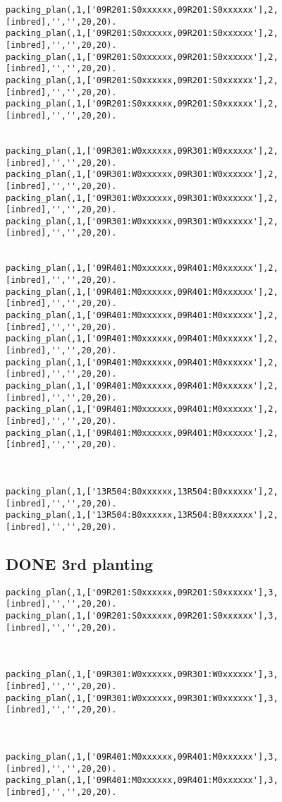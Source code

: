 \documentclass[11pt]{article}
\begin{document}
\begin{verbatim}
packing_plan(,1,['09R201:S0xxxxxx,09R201:S0xxxxxx'],2,[inbred],'','',20,20).
packing_plan(,1,['09R201:S0xxxxxx,09R201:S0xxxxxx'],2,[inbred],'','',20,20).
packing_plan(,1,['09R201:S0xxxxxx,09R201:S0xxxxxx'],2,[inbred],'','',20,20).
packing_plan(,1,['09R201:S0xxxxxx,09R201:S0xxxxxx'],2,[inbred],'','',20,20).
packing_plan(,1,['09R201:S0xxxxxx,09R201:S0xxxxxx'],2,[inbred],'','',20,20).


packing_plan(,1,['09R301:W0xxxxxx,09R301:W0xxxxxx'],2,[inbred],'','',20,20).
packing_plan(,1,['09R301:W0xxxxxx,09R301:W0xxxxxx'],2,[inbred],'','',20,20).
packing_plan(,1,['09R301:W0xxxxxx,09R301:W0xxxxxx'],2,[inbred],'','',20,20).
packing_plan(,1,['09R301:W0xxxxxx,09R301:W0xxxxxx'],2,[inbred],'','',20,20).


packing_plan(,1,['09R401:M0xxxxxx,09R401:M0xxxxxx'],2,[inbred],'','',20,20).
packing_plan(,1,['09R401:M0xxxxxx,09R401:M0xxxxxx'],2,[inbred],'','',20,20).
packing_plan(,1,['09R401:M0xxxxxx,09R401:M0xxxxxx'],2,[inbred],'','',20,20).
packing_plan(,1,['09R401:M0xxxxxx,09R401:M0xxxxxx'],2,[inbred],'','',20,20).
packing_plan(,1,['09R401:M0xxxxxx,09R401:M0xxxxxx'],2,[inbred],'','',20,20).
packing_plan(,1,['09R401:M0xxxxxx,09R401:M0xxxxxx'],2,[inbred],'','',20,20).
packing_plan(,1,['09R401:M0xxxxxx,09R401:M0xxxxxx'],2,[inbred],'','',20,20).
packing_plan(,1,['09R401:M0xxxxxx,09R401:M0xxxxxx'],2,[inbred],'','',20,20).



packing_plan(,1,['13R504:B0xxxxxx,13R504:B0xxxxxx'],2,[inbred],'','',20,20).
packing_plan(,1,['13R504:B0xxxxxx,13R504:B0xxxxxx'],2,[inbred],'','',20,20).
\end{verbatim}



\subsection{{\bfseries\sffamily DONE} 3rd planting}
\label{sec-3-3}

\begin{verbatim}
packing_plan(,1,['09R201:S0xxxxxx,09R201:S0xxxxxx'],3,[inbred],'','',20,20).
packing_plan(,1,['09R201:S0xxxxxx,09R201:S0xxxxxx'],3,[inbred],'','',20,20).



packing_plan(,1,['09R301:W0xxxxxx,09R301:W0xxxxxx'],3,[inbred],'','',20,20).
packing_plan(,1,['09R301:W0xxxxxx,09R301:W0xxxxxx'],3,[inbred],'','',20,20).



packing_plan(,1,['09R401:M0xxxxxx,09R401:M0xxxxxx'],3,[inbred],'','',20,20).
packing_plan(,1,['09R401:M0xxxxxx,09R401:M0xxxxxx'],3,[inbred],'','',20,20).
\end{verbatim}
\end{document}

